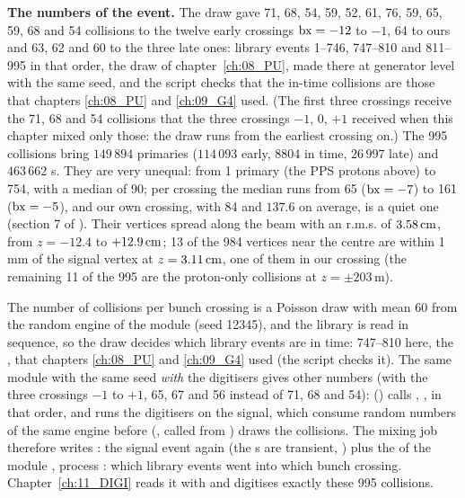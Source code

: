 \textbf{The numbers of the event.} The draw gave 71, 68, 54, 59, 52, 61, 76, 59, 65, 59, 68 and 54 collisions to
the twelve early crossings $\mathrm{bx}=-12$ to $-1$, 64 to ours and 63, 62 and 60 to the three late ones: library events
1--746, 747--810 and 811--995 in that order, the draw of chapter~\ref{ch:08_PU}, made there at generator level with
the same seed, and the script checks that the in-time collisions are those that chapters \ref{ch:08_PU} and
\ref{ch:09_G4} used. (The first three crossings receive the 71, 68 and 54 collisions that the three crossings $-1$,
0, $+1$ received when this chapter mixed only those: the draw runs from the earliest crossing on.) The 995 collisions
bring $149\,894$ primaries ($114\,093$ early, 8804 in time, $26\,997$ late) and $463\,662$ s. They are
very unequal: from 1 primary (the PPS protons above) to 754, with a median of 90; per crossing the median runs from
65 ($\mathrm{bx}=-7$) to 161 ($\mathrm{bx}=-5$), and our own crossing, with 84 and $137.6$ on average, is a quiet one (section 7 of
). Their vertices spread along the beam with an r.m.s. of $3.58\,\mathrm{cm}$, from $z=-12.4$ to
$+12.9\,\mathrm{cm}$; 13 of the 984 vertices near the centre are within 1\,mm of the signal vertex at $z=3.11\,\mathrm{cm}$, one of them
in our crossing (the remaining 11 of the 995 are the proton-only collisions at $z=\pm203$\,m).

\begin{plainwords}
The number of collisions per bunch crossing is a Poisson draw with mean 60 from the random engine of the module
 (seed 12345), and the library is read in sequence, so the draw decides which library events are in time:
747--810 here, the ,  that chapters \ref{ch:08_PU} and \ref{ch:09_G4} used (the
script checks it). The same module with the same seed \emph{with} the digitisers gives other numbers (with the three
crossings $-1$ to $+1$, 65, 67 and 56 instead of 71, 68 and 54):  () calls
, ,  in that order, and  runs the
digitisers on the signal, which consume random numbers of the same engine before 
(, called from ) draws
the collisions. The mixing job therefore writes : the signal event again (the
s are transient, ) plus the  of
the module , process : which library events went into which bunch crossing.
Chapter~\ref{ch:11_DIGI} reads it with  and digitises exactly these 995 collisions.
\end{plainwords}


